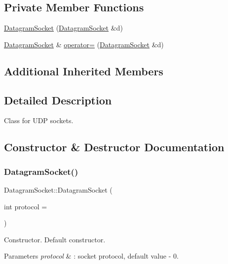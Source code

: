 \subsection*{Private Member Functions}
\begin{DoxyCompactItemize}
\item 
\hyperlink{classDatagramSocket_a46a9ca425d2204ab613a28c090f289cb}{Datagram\+Socket} (\hyperlink{classDatagramSocket}{Datagram\+Socket} \&d)
\item 
\hyperlink{classDatagramSocket}{Datagram\+Socket} \& \hyperlink{classDatagramSocket_a41156b8c7e27298d96ea4414654f6cb4}{operator=} (\hyperlink{classDatagramSocket}{Datagram\+Socket} \&d)
\end{DoxyCompactItemize}
\subsection*{Additional Inherited Members}


\subsection{Detailed Description}
Class for U\+DP sockets. 

\subsection{Constructor \& Destructor Documentation}
\mbox{\label{classDatagramSocket_a154493cb7278a67055b303aed93c4272}} 
\subsubsection{\texorpdfstring{Datagram\+Socket()}{DatagramSocket()}\hspace{0.1cm}{\footnotesize\ttfamily [1/2]}}
{\footnotesize\ttfamily Datagram\+Socket\+::\+Datagram\+Socket (\begin{DoxyParamCaption}\item[{int}]{protocol = {} }\end{DoxyParamCaption})}

Constructor. Default constructor. 
\begin{DoxyParams}{Parameters}
{\em protocol} & \+: socket protocol, default value -\/ 0. \\
\hline
\end{DoxyParams}

